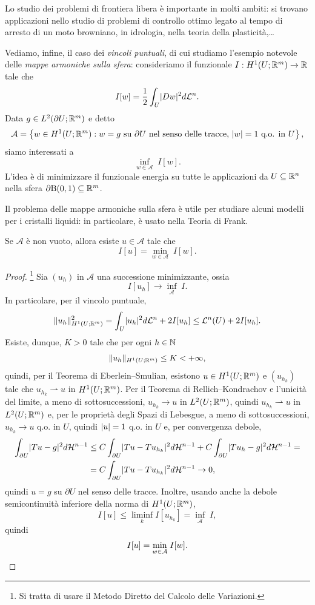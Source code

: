 \begin{osservazione}
Lo studio dei problemi di frontiera libera è importante in molti ambiti: si trovano applicazioni nello studio di problemi di controllo ottimo legato al tempo di arresto di un moto browniano, in idrologia, nella teoria della plasticità,\dots
\end{osservazione}

Vediamo, infine, il caso dei \emph{vincoli puntuali}, di cui studiamo l'esempio notevole delle \emph{mappe armoniche sulla sfera}: consideriamo il funzionale $I: H^1(U;\mathbb{R}^m) \to \mathbb{R}$ tale che
\[ I[w] = \frac{1}{2}\int_U \lvert Dw\rvert^2  d\mathcal{L}^n. \]
Data $g \in L^2(\partial U;\mathbb{R}^m)$ e detto
\[ \mathcal{A} = \left\lbrace w \in H^1(U;\mathbb{R}^m): w = g \textup{ su } \partial U \textup{ nel senso delle tracce, } \lvert w\rvert = 1 \textup{ q.o. in } U\right\rbrace, \]
siamo interessati a 
\[ \underset{w \in \mathcal{A}}{\inf}\; I[w]. \]
L'idea è di minimizzare il funzionale energia su tutte le applicazioni da $U\subseteq \mathbb{R}^n$ nella sfera $\partial\textup{B}(0,1)\subseteq \mathbb{R}^m$.
\begin{osservazione}
Il problema delle mappe armoniche sulla sfera è utile per studiare alcuni modelli per i cristalli liquidi: in particolare, è usato nella Teoria di Frank.
\end{osservazione}
\begin{teorema}
	Se $\mathcal{A}$ è non vuoto, allora esiste $u \in \mathcal{A}$ tale che 
	\[ I[u] =  \underset{w \in \mathcal{A}}{\min}\; I[w]. \] 
\end{teorema}
\begin{proof}\footnote{Si tratta di usare il Metodo Diretto del Calcolo delle Variazioni.}
Sia $(u_h)$ in $\mathcal{A}$ una successione minimizzante, ossia 
\[ I[u_h] \to \underset{\mathcal{A}}{\inf}\; I. \]
In particolare, per il vincolo puntuale,
\[ \lVert u_h\rVert_{H^1(U;\mathbb{R}^m)}^2 = \int_U \lvert u_h\rvert^2d\mathcal{L}^n + 2I[u_h]\le \mathcal{L}^n(U) + 2I[u_h]. \]
Esiste, dunque, $K>0$ tale che per ogni $h \in \mathbb{N}$
\[ \lVert u_h\rVert_{H^1(U;\mathbb{R}^m)} \le K <+\infty, \]
quindi, per il Teorema di Eberlein--Smulian, esistono $u \in H^1(U;\mathbb{R}^m)$ e $(u_{h_k})$ tale che $u_{h_k} \rightharpoonup u$ in $H^1(U;\mathbb{R}^m)$.
Per il Teorema di Rellich--Kondrachov e l'unicità del limite, a meno di sottosuccessioni, $u_{h_k} \to u$ in $L^2(U;\mathbb{R}^m)$, quindi $u_{h_k} \rightharpoonup u$ in $L^2(U;\mathbb{R}^m)$ e, per le proprietà degli Spazi di Lebesgue, a meno di sottosuccessioni, $u_{h_k} \to u$ q.o. in $U$, quindi $\lvert u\rvert =1 $ q.o. in $U$ e, per convergenza debole,
\begin{align*}
	\int_{\partial U} \lvert Tu-g\rvert^2d\mathcal{H}^{n-1}&\le C \int_{\partial U} \lvert Tu-Tu_{h_k}\rvert^2d\mathcal{H}^{n-1} + C \int_{\partial U} \lvert Tu_h-g\rvert^2d\mathcal{H}^{n-1} = \\
	&= C\int_{\partial U} \lvert Tu-Tu_{h_k}\rvert^2d\mathcal{H}^{n-1} \to 0,
\end{align*}
quindi $u=g$ su $\partial U$ nel senso delle tracce. Inoltre, usando anche la debole semicontinuità inferiore della norma di $H^1(U;\mathbb{R}^m)$, 
\[ I[u] \le \underset{k}{\liminf} I[u_{h_k}] = \underset{\mathcal{A}}{\inf}\; I, \]
quindi 
\[ I[u] =  \underset{w \in \mathcal{A}}{\min}\; I[w]. \qedhere \]
\end{proof}
